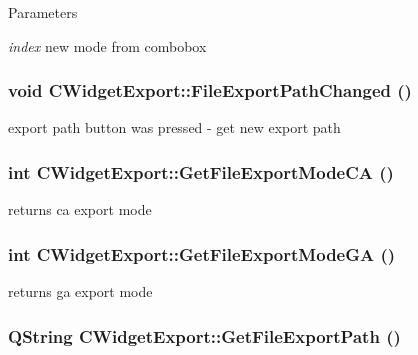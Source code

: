 \begin{DoxyParams}{Parameters}
\item[{\em index}]new mode from combobox \end{DoxyParams}
\hypertarget{classCWidgetExport_a2eea5bb37bb71fde552228db4bad0fbd}{
\subsubsection[{FileExportPathChanged}]{\setlength{\rightskip}{0pt plus 5cm}void CWidgetExport::FileExportPathChanged ()}}
\label{classCWidgetExport_a2eea5bb37bb71fde552228db4bad0fbd}
export path button was pressed -\/ get new export path \hypertarget{classCWidgetExport_ab045a70c440213701a41d26312017303}{
\subsubsection[{GetFileExportModeCA}]{\setlength{\rightskip}{0pt plus 5cm}int CWidgetExport::GetFileExportModeCA ()}}
\label{classCWidgetExport_ab045a70c440213701a41d26312017303}
returns ca export mode \hypertarget{classCWidgetExport_a68238c2782d4facb5517f3e8f5c2cff0}{
\subsubsection[{GetFileExportModeGA}]{\setlength{\rightskip}{0pt plus 5cm}int CWidgetExport::GetFileExportModeGA ()}}
\label{classCWidgetExport_a68238c2782d4facb5517f3e8f5c2cff0}
returns ga export mode \hypertarget{classCWidgetExport_a869e5eda5f0b9c54c4c3d271f563e60a}{
\subsubsection[{GetFileExportPath}]{\setlength{\rightskip}{0pt plus 5cm}QString CWidgetExport::GetFileExportPath ()}}
